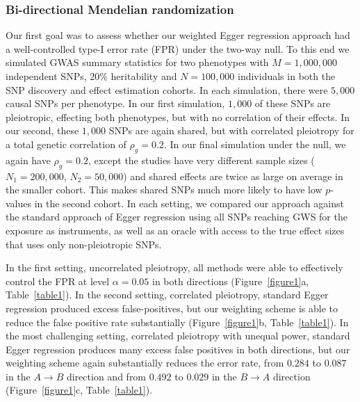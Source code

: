 \documentclass{article}
\begin{document}
\subsubsection*{Bi-directional Mendelian randomization}
Our first goal was to assess whether our weighted Egger regression approach
had a well-controlled type-I error rate (FPR) under the two-way null. To this
end we simulated GWAS summary statistics for two phenotypes with $M=1,000,000$
independent SNPs, $20\%$ heritability and $N = 100,000$ individuals in both
 the SNP discovery and effect estimation cohorts. In each simulation, there
 were $5,000$ causal
SNPs per phenotype. In our first simulation, $1,000$ of these SNPs are pleiotropic,
effecting both phenotypes, but with no correlation of their effects. In our
second, these $1,000$ SNPs are again shared, but with correlated pleiotropy
for a total genetic correlation of $\rho_g = 0.2$. In our final simulation under the
null, we again have $\rho_g = 0.2$, except the studies have very different sample sizes
($N_1 = 200,000$, $N_2 = 50,000$) and shared effects are twice as large on average
in the smaller cohort. This makes shared SNPs much more likely to have
low $p$-values in the second cohort. In each setting, we compared our approach
against the standard approach of Egger regression using all SNPs reaching GWS for
 the exposure as instruments, as well as an oracle with access to the true
effect sizes that uses only non-pleiotropic SNPs.

In the first setting, uncorrelated pleiotropy, all methods were able to 
effectively control the FPR at level $\alpha = 0.05$ in both directions
(Figure~\ref{figure1}a, Table~\ref{table1}).
In the second setting, correlated pleiotropy,
standard Egger regression produced excess false-positives, but our weighting
scheme is able to reduce the false positive rate substantially
(Figure~\ref{figure1}b, Table~\ref{table1}).  In the most challenging setting,
correlated pleiotropy with unequal power, standard Egger regression produces
many excess false positives in both directions, but our weighting scheme
again substantially reduces the error rate, from $0.284$ to $0.087$ in
the $A\rightarrow B$ direction and from $0.492$ to $0.029$ in the 
$B\rightarrow A$ direction (Figure~\ref{figure1}c, Table~\ref{table1}).
\end{document}
